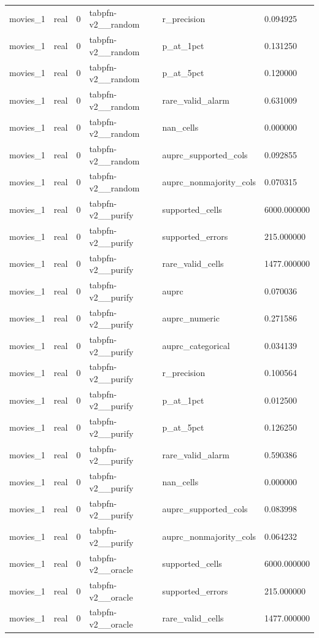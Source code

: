 \begin{tabular}{llllll}
movies\_1 & real & 0 & tabpfn-v2\_\_random & r\_precision & 0.094925 \\
movies\_1 & real & 0 & tabpfn-v2\_\_random & p\_at\_1pct & 0.131250 \\
movies\_1 & real & 0 & tabpfn-v2\_\_random & p\_at\_5pct & 0.120000 \\
movies\_1 & real & 0 & tabpfn-v2\_\_random & rare\_valid\_alarm & 0.631009 \\
movies\_1 & real & 0 & tabpfn-v2\_\_random & nan\_cells & 0.000000 \\
movies\_1 & real & 0 & tabpfn-v2\_\_random & auprc\_supported\_cols & 0.092855 \\
movies\_1 & real & 0 & tabpfn-v2\_\_random & auprc\_nonmajority\_cols & 0.070315 \\
movies\_1 & real & 0 & tabpfn-v2\_\_purify & supported\_cells & 6000.000000 \\
movies\_1 & real & 0 & tabpfn-v2\_\_purify & supported\_errors & 215.000000 \\
movies\_1 & real & 0 & tabpfn-v2\_\_purify & rare\_valid\_cells & 1477.000000 \\
movies\_1 & real & 0 & tabpfn-v2\_\_purify & auprc & 0.070036 \\
movies\_1 & real & 0 & tabpfn-v2\_\_purify & auprc\_numeric & 0.271586 \\
movies\_1 & real & 0 & tabpfn-v2\_\_purify & auprc\_categorical & 0.034139 \\
movies\_1 & real & 0 & tabpfn-v2\_\_purify & r\_precision & 0.100564 \\
movies\_1 & real & 0 & tabpfn-v2\_\_purify & p\_at\_1pct & 0.012500 \\
movies\_1 & real & 0 & tabpfn-v2\_\_purify & p\_at\_5pct & 0.126250 \\
movies\_1 & real & 0 & tabpfn-v2\_\_purify & rare\_valid\_alarm & 0.590386 \\
movies\_1 & real & 0 & tabpfn-v2\_\_purify & nan\_cells & 0.000000 \\
movies\_1 & real & 0 & tabpfn-v2\_\_purify & auprc\_supported\_cols & 0.083998 \\
movies\_1 & real & 0 & tabpfn-v2\_\_purify & auprc\_nonmajority\_cols & 0.064232 \\
movies\_1 & real & 0 & tabpfn-v2\_\_oracle & supported\_cells & 6000.000000 \\
movies\_1 & real & 0 & tabpfn-v2\_\_oracle & supported\_errors & 215.000000 \\
movies\_1 & real & 0 & tabpfn-v2\_\_oracle & rare\_valid\_cells & 1477.000000 \\

\end{tabular}
